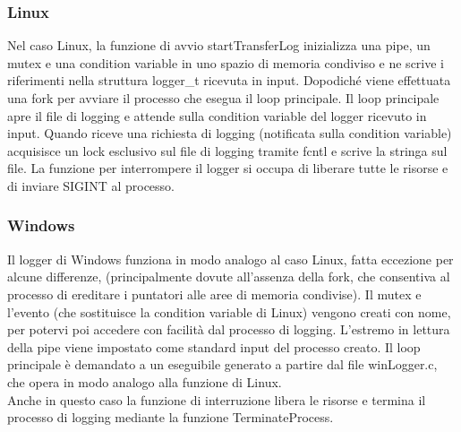 \documentclass{article}
\begin{document}
\subsubsection{Linux}
Nel caso Linux, la funzione di avvio startTransferLog inizializza una pipe, un mutex e una condition variable
in uno spazio di memoria condiviso e ne scrive i riferimenti nella struttura logger\_t ricevuta in input.
Dopodiché viene effettuata una fork per avviare il processo che esegua il loop principale.
Il loop principale apre il file di logging e attende sulla condition variable del logger ricevuto in input.
Quando riceve una richiesta di logging (notificata sulla condition variable) acquisisce un lock
esclusivo sul file di logging tramite fcntl e scrive la stringa sul file.
La funzione per interrompere il logger si occupa di liberare tutte le risorse e di inviare SIGINT
al processo.

\subsubsection{Windows}
Il logger di Windows funziona in modo analogo al caso Linux, fatta eccezione per alcune differenze,
(principalmente dovute all'assenza della fork, che consentiva al processo di ereditare i puntatori alle
aree di memoria condivise).
Il mutex e l'evento (che sostituisce la condition variable di Linux) vengono creati con nome, per
potervi poi accedere con facilità dal processo di logging. L'estremo in lettura della pipe viene 
impostato come standard input del processo creato. Il loop principale è demandato a un eseguibile
generato a partire dal file winLogger.c, che opera in modo analogo alla funzione di Linux.\\
Anche in questo caso la funzione di interruzione libera le risorse e termina il processo di logging
mediante la funzione TerminateProcess.
\end{document}
